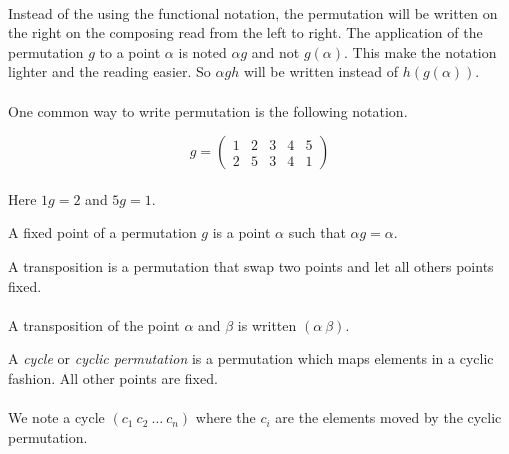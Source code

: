 \paragraph{}
Instead of the using the functional notation, the permutation will be written on the right on the composing read from the left to right. The application of the permutation $g$ to a point $\alpha$ is noted $\alpha g$ and not $g(\alpha)$. This make the notation lighter and the reading easier. So $\alpha gh$ will be written instead of $h(g(\alpha))$.

\paragraph{}
One common way to write permutation is the following notation.

\[
  g =
  \left(
    \begin{array}{ccccc}
      1 & 2 & 3 & 4 & 5\\
      2 & 5 & 3 & 4 & 1
    \end{array}
  \right)
\]

\paragraph{}
Here $1g = 2$ and $5g = 1$.

\begin{definition}
  A fixed point of a permutation $g$ is a point $\alpha$ such that $\alpha g = \alpha$.
\end{definition}

\begin{definition}[Transposition]
  A transposition is a permutation that swap two points and let all others points fixed.
\end{definition}

\paragraph{}
A transposition of the point $\alpha$ and $\beta$ is written $(\alpha\ \beta)$.

\begin{definition}[Cycle]
  A \textit{cycle} or \textit{cyclic permutation} is a permutation which maps elements in a cyclic fashion. All other points are fixed.
\end{definition}

\paragraph{}
We note a cycle $(c_1\ c_2\ \dots\ c_n)$ where the $c_i$ are the elements moved by the cyclic permutation.

